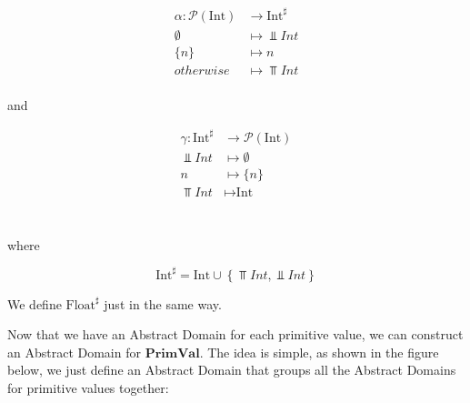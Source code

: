\null\hfill
  \begin{minipage}{.35\textwidth}
    \[\begin{array}{rl}
      \alpha \colon \mathcal{P}(\text{Int}) &\to \text{Int}^\sharp \\
      \emptyset &\mapsto \Bot{Int} \\
      \{n\} &\mapsto n \\
      otherwise &\mapsto \Top{Int} \\
    \end{array}\]
  \end{minipage}
  and
  \begin{minipage}{.35\textwidth}
    \[\begin{array}{rl}
      \gamma \colon \text{Int}^\sharp &\to \mathcal{P}(\text{Int}) \\
      \Bot{Int} &\mapsto \emptyset \\
      n &\mapsto \{n\} \\
      \Top{Int} &\mapsto \text{Int} \\
    \end{array}\]
  \end{minipage}
\hfill\null
\\[.6em]

where

\[\text{Int}^\sharp = \text{Int} \cup \left\{ \Top{Int}, \Bot{Int} \right\}\]


We define \(\text{Float}^\sharp\) just in the same way.

Now that we have an Abstract Domain for each primitive value, we can construct an
Abstract Domain for \(\mathbf{PrimVal}\). The idea is simple, as shown in the figure
below, we just define an Abstract Domain that groups all the Abstract Domains for
primitive values together:

\begin{center}

\end{center}


